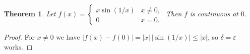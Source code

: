 \documentclass[12pt]{article}
\newtheorem{theorem}{Theorem}
\theoremstyle{definition}
\newcommand{\eps}{\varepsilon}
\begin{document}
\begin{theorem}
Let $f(x) = \begin{cases} x \sin(1/x) & x \neq 0, \\ 0 & x = 0. \end{cases}$
Then $f$ is continuous at $0$.
\end{theorem}

\begin{proof}
For $x \neq 0$ we have $|f(x) - f(0)| = |x|\,|\sin(1/x)| \le |x|$, so
$\delta = \eps$ works.
\end{proof}
\end{document}
